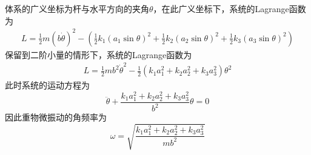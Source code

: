 \begin{solution}
体系的广义坐标为杆与水平方向的夹角$\theta$，在此广义坐标下，系统的Lagrange函数为
\begin{align*}
	L = \frac12 m(b\dot{\theta})^2 - \left(\frac12 k_1 (a_1\sin \theta)^2 + \frac12 k_2 (a_2\sin \theta)^2 + \frac12 k_3 (a_3\sin \theta)^2\right)
\end{align*}
保留到二阶小量的情形下，系统的Lagrange函数为
\begin{align*}
	L = \frac12 mb^2 \dot{\theta}^2 - \frac12 \left(k_1 a_1^2 + k_2 a_2^2 + k_3 a_3^2\right) \theta^2
\end{align*}
此时系统的运动方程为
\begin{equation*}
	\ddot{\theta} + \frac{k_1 a_1^2 + k_2 a_2^2 + k_3 a_3^2}{b^2} \theta = 0
\end{equation*}
因此重物微振动的角频率为
\begin{equation*}
	\omega = \sqrt{\frac{k_1 a_1^2 + k_2 a_2^2 + k_3 a_3^2}{mb^2}}
\end{equation*}
\end{solution}
